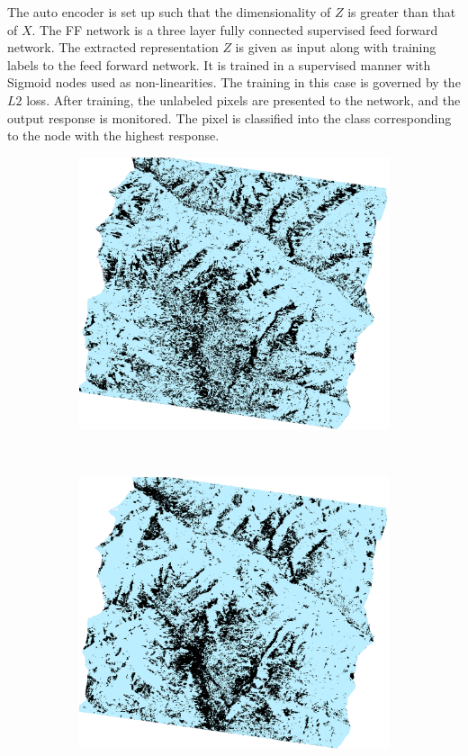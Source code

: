 \documentclass[12pt, a4paper]{article}
\begin{document}
The auto encoder is set up such that the dimensionality of $Z$ is greater than that of $X$. The FF network is a three layer fully connected supervised feed forward network. The extracted representation $Z$ is given as input along with training labels to the feed forward network. It is trained in a supervised manner with Sigmoid nodes used as non-linearities. The training in this case is governed by the $L2$ loss. After training, the unlabeled pixels are presented to the network, and the output response is monitored. The pixel is classified into the class corresponding to the node with the highest response. 

\begin{figure}
\centering
\begin{subfigure}[b]{0.35\columnwidth}
\includegraphics[width=\textwidth]{Figures/SnowCover2018/Hyb}
\caption{}
\end{subfigure}
~
\begin{subfigure}[b]{0.35\columnwidth}
\includegraphics[width=\textwidth]{Figures/SnowCover2018/Lin} 
\caption{}
\end{subfigure}


\end{figure}
\end{document}
